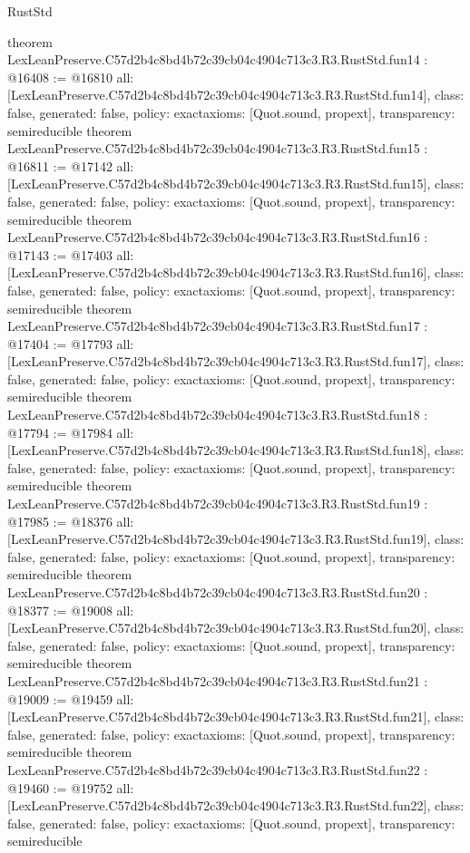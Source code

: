 \begin{lexlean}{RustStd}
\begin{coremodule}
{}
theorem LexLeanPreserve.C57d2b4c8bd4b72c39cb04c4904c713c3.R3.RustStd.fun14 : @16408 := @16810 {
  all: [LexLeanPreserve.C57d2b4c8bd4b72c39cb04c4904c713c3.R3.RustStd.fun14],
  class: false,
  generated: false,
  policy: exact{axioms: [Quot.sound, propext]},
  transparency: semireducible
}
theorem LexLeanPreserve.C57d2b4c8bd4b72c39cb04c4904c713c3.R3.RustStd.fun15 : @16811 := @17142 {
  all: [LexLeanPreserve.C57d2b4c8bd4b72c39cb04c4904c713c3.R3.RustStd.fun15],
  class: false,
  generated: false,
  policy: exact{axioms: [Quot.sound, propext]},
  transparency: semireducible
}
theorem LexLeanPreserve.C57d2b4c8bd4b72c39cb04c4904c713c3.R3.RustStd.fun16 : @17143 := @17403 {
  all: [LexLeanPreserve.C57d2b4c8bd4b72c39cb04c4904c713c3.R3.RustStd.fun16],
  class: false,
  generated: false,
  policy: exact{axioms: [Quot.sound, propext]},
  transparency: semireducible
}
theorem LexLeanPreserve.C57d2b4c8bd4b72c39cb04c4904c713c3.R3.RustStd.fun17 : @17404 := @17793 {
  all: [LexLeanPreserve.C57d2b4c8bd4b72c39cb04c4904c713c3.R3.RustStd.fun17],
  class: false,
  generated: false,
  policy: exact{axioms: [Quot.sound, propext]},
  transparency: semireducible
}
theorem LexLeanPreserve.C57d2b4c8bd4b72c39cb04c4904c713c3.R3.RustStd.fun18 : @17794 := @17984 {
  all: [LexLeanPreserve.C57d2b4c8bd4b72c39cb04c4904c713c3.R3.RustStd.fun18],
  class: false,
  generated: false,
  policy: exact{axioms: [Quot.sound, propext]},
  transparency: semireducible
}
theorem LexLeanPreserve.C57d2b4c8bd4b72c39cb04c4904c713c3.R3.RustStd.fun19 : @17985 := @18376 {
  all: [LexLeanPreserve.C57d2b4c8bd4b72c39cb04c4904c713c3.R3.RustStd.fun19],
  class: false,
  generated: false,
  policy: exact{axioms: [Quot.sound, propext]},
  transparency: semireducible
}
theorem LexLeanPreserve.C57d2b4c8bd4b72c39cb04c4904c713c3.R3.RustStd.fun20 : @18377 := @19008 {
  all: [LexLeanPreserve.C57d2b4c8bd4b72c39cb04c4904c713c3.R3.RustStd.fun20],
  class: false,
  generated: false,
  policy: exact{axioms: [Quot.sound, propext]},
  transparency: semireducible
}
theorem LexLeanPreserve.C57d2b4c8bd4b72c39cb04c4904c713c3.R3.RustStd.fun21 : @19009 := @19459 {
  all: [LexLeanPreserve.C57d2b4c8bd4b72c39cb04c4904c713c3.R3.RustStd.fun21],
  class: false,
  generated: false,
  policy: exact{axioms: [Quot.sound, propext]},
  transparency: semireducible
}
theorem LexLeanPreserve.C57d2b4c8bd4b72c39cb04c4904c713c3.R3.RustStd.fun22 : @19460 := @19752 {
  all: [LexLeanPreserve.C57d2b4c8bd4b72c39cb04c4904c713c3.R3.RustStd.fun22],
  class: false,
  generated: false,
  policy: exact{axioms: [Quot.sound, propext]},
  transparency: semireducible
}
\end{coremodule}
\end{lexlean}
